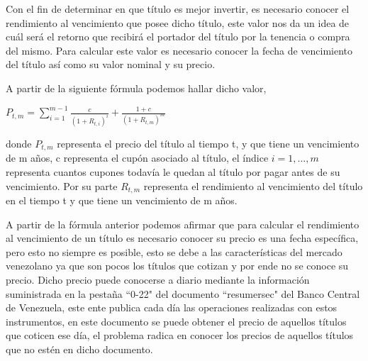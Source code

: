 \vspace{0.5cm}

\hspace*{0.4 cm} Con el fin de determinar en que t\'itulo es mejor invertir, es necesario conocer el rendimiento al vencimiento que posee dicho t\'itulo, este valor nos da un idea de cu\'al ser\'a el retorno que recibir\'a el portador del t\'itulo por la tenencia o compra del mismo. Para calcular este valor es necesario conocer la fecha de vencimiento del t\'itulo as\'i como su valor nominal y su precio.


 \hspace*{0.4 cm} A partir de la siguiente f\'ormula podemos hallar dicho valor,

\vspace{0.5cm}

\begin{center}

$\displaystyle{P_{t,m} = \sum_{i=1}^{m-1}{\frac{c}{(1+R_{t,i})^i} + \frac{1+c}{(1+R_{t,m})^m}} }$

\end{center}

\vspace{0.5cm}

\noindent donde $P_{t,m}$ representa el precio del t\'itulo al tiempo t, y que tiene un vencimiento de m a\~nos, c representa el cup\'on asociado al t\'itulo, el \'indice $i = 1,...,m$ representa cuantos cupones todav\'ia le quedan al t\'itulo por pagar antes de su vencimiento. Por su parte $R_{t,m}$ representa el rendimiento al vencimiento del t\'itulo en el tiempo t y que tiene un vencimiento de m a\~nos.

\vspace{0.5cm}

\hspace*{0.4 cm}A partir de la f\'ormula anterior podemos afirmar que para calcular el rendimiento al vencimiento de un t\'itulo es necesario conocer su precio es una fecha espec\'ifica, pero esto no siempre es posible, esto se debe a las caracter\'isticas del mercado venezolano ya que son pocos los t\'itulos que cotizan y por ende no se conoce su precio. Dicho precio puede conocerse a diario mediante la informaci\'on suministrada en la pesta\~na ``0-22" del documento ``resumersec" del Banco Central de Venezuela, este ente \hspace{0.3cm} publica cada d\'ia las operaciones realizadas con estos instrumentos, en este documento se puede obtener el precio de aquellos t\'itulos que coticen ese d\'ia, el problema radica en conocer los precios de aquellos t\'itulos que no est\'en en dicho documento.



